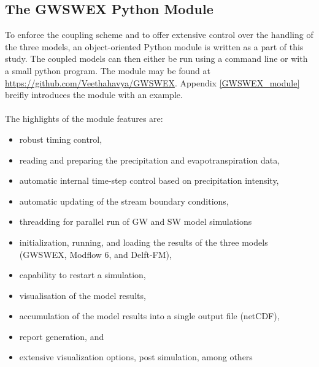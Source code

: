 \subsection{The GWSWEX Python Module}
\label{GWSWEXpy}
To enforce the coupling scheme and to offer extensive control over the handling of the three models, an object-oriented Python module is written as a part of this study. The coupled models can then either be run using a command line or with a small python program. The module may be found at \url{https://github.com/Veethahavya/GWSWEX}. Appendix \ref{GWSWEX_module} breifly introduces the module with an example.
\\ \\
The highlights of the module features are:
\begin{itemize}
    \item robust timing control,
    \item reading and preparing the precipitation and evapotranspiration data,
    \item automatic internal time-step control based on precipitation intensity,
    \item automatic updating of the stream boundary conditions,
    \item threadding for parallel run of GW and SW model simulations
    \item initialization, running, and loading the results of the three models (GWSWEX, Modflow 6, and Delft-FM),
    \item capability to restart a simulation,
    \item visualisation of the model results,
    \item accumulation of the model results into a single output file (netCDF),
    \item report generation, and
    \item extensive visualization options, post simulation, among others
\end{itemize}



\endinput
